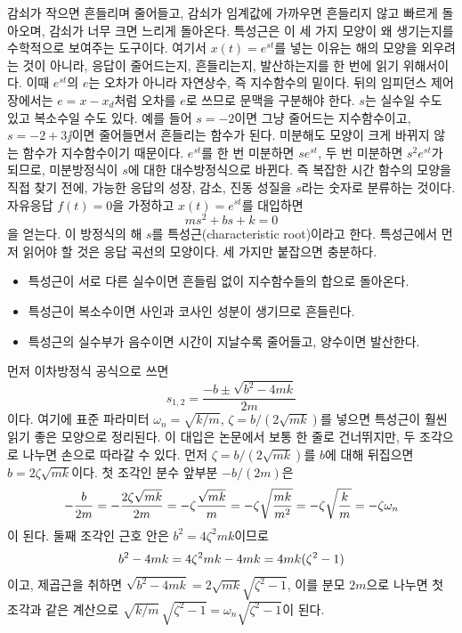 감쇠가 작으면 흔들리며 줄어들고, 감쇠가 임계값에 가까우면 흔들리지 않고 빠르게 돌아오며, 감쇠가 너무 크면 느리게 돌아온다.
특성근은 이 세 가지 모양이 왜 생기는지를 수학적으로 보여주는 도구이다.
여기서 $x(t)=e^{st}$를 넣는 이유는 해의 모양을 외우려는 것이 아니라, 응답이 줄어드는지, 흔들리는지, 발산하는지를 한 번에 읽기 위해서이다.
이때 $e^{st}$의 $e$는 오차가 아니라 자연상수, 즉 지수함수의 밑이다.
뒤의 임피던스 제어 장에서는 $e=x-x_d$처럼 오차를 $e$로 쓰므로 문맥을 구분해야 한다.
$s$는 실수일 수도 있고 복소수일 수도 있다.
예를 들어 $s=-2$이면 그냥 줄어드는 지수함수이고, $s=-2+3\jj$이면 줄어들면서 흔들리는 함수가 된다.
미분해도 모양이 크게 바뀌지 않는 함수가 지수함수이기 때문이다.
$e^{st}$를 한 번 미분하면 $se^{st}$, 두 번 미분하면 $s^2e^{st}$가 되므로, 미분방정식이 $s$에 대한 대수방정식으로 바뀐다.
즉 복잡한 시간 함수의 모양을 직접 찾기 전에, 가능한 응답의 성장, 감소, 진동 성질을 $s$라는 숫자로 분류하는 것이다.
자유응답 $f(t)=0$을 가정하고 $x(t)=e^{st}$를 대입하면
\begin{equation}
  ms^2+bs+k=0
\end{equation}
을 얻는다.
이 방정식의 해 $s$를 특성근(characteristic root)이라고 한다.
특성근에서 먼저 읽어야 할 것은 응답 곡선의 모양이다.
세 가지만 붙잡으면 충분하다.
\begin{itemize}
  \item 특성근이 서로 다른 실수이면 흔들림 없이 지수함수들의 합으로 돌아온다.
  \item 특성근이 복소수이면 사인과 코사인 성분이 생기므로 흔들린다.
  \item 특성근의 실수부가 음수이면 시간이 지날수록 줄어들고, 양수이면 발산한다.
\end{itemize}
먼저 이차방정식 공식으로 쓰면
\begin{equation}
  s_{1,2}
  =
  \frac{-b\pm\sqrt{b^2-4mk}}{2m}
\end{equation}
이다.
여기에 표준 파라미터 $\omega_n=\sqrt{k/m}$, $\zeta=b/(2\sqrt{mk})$를 넣으면 특성근이 훨씬 읽기 좋은 모양으로 정리된다.
이 대입은 논문에서 보통 한 줄로 건너뛰지만, 두 조각으로 나누면 손으로 따라갈 수 있다.
먼저 $\zeta=b/(2\sqrt{mk})$를 $b$에 대해 뒤집으면 $b=2\zeta\sqrt{mk}$이다.
첫 조각인 분수 앞부분 $-b/(2m)$은
\[
  -\frac{b}{2m}
  =
  -\frac{2\zeta\sqrt{mk}}{2m}
  =
  -\zeta\frac{\sqrt{mk}}{m}
  =
  -\zeta\sqrt{\frac{mk}{m^2}}
  =
  -\zeta\sqrt{\frac{k}{m}}
  =
  -\zeta\omega_n
\vmark{charroot-substitution-decay-piece}%
\]
이 된다.
둘째 조각인 근호 안은 $b^2=4\zeta^2mk$이므로
\[
  b^2-4mk
  =
  4\zeta^2mk-4mk
  =
  4mk(\zeta^2-1)
\vmark{charroot-substitution-radical-piece}%
\]
이고, 제곱근을 취하면 $\sqrt{b^2-4mk}=2\sqrt{mk}\sqrt{\zeta^2-1}$, 이를 분모 $2m$으로 나누면 첫 조각과 같은 계산으로 $\sqrt{k/m}\,\sqrt{\zeta^2-1}=\omega_n\sqrt{\zeta^2-1}$이 된다.
